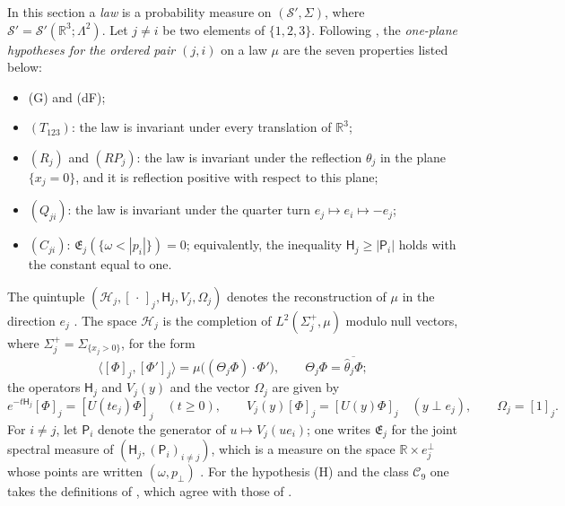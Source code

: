 \documentclass[11pt,letterpaper,reqno]{amsart}
\theoremstyle{definition}
\begin{document}
In this section a \emph{law} is a probability measure on $(\mathcal S',\Sigma)$, where $\mathcal S'=\mathcal S'(\mathbb R^3;\Lambda^2)$.
Let $j\ne i$ be two elements of $\{1,2,3\}$.
Following \cite[Definition~14.2\,(f)]{QEDII}, the \emph{one-plane hypotheses for the ordered pair $(j,i)$} on a law $\mu$ are the seven properties listed below:
\begin{itemize}
\item (G) and (dF);
\item $(T_{123})$: the law is invariant under every translation of $\mathbb R^3$;
\item $(R_j)$ and $(RP_j)$: the law is invariant under the reflection $\theta_j$ in the plane $\{x_j=0\}$, and it is reflection positive with respect to this plane;
\item $(Q_{ji})$: the law is invariant under the quarter turn $e_j\mapsto e_i\mapsto-e_j$;
\item $(C_{ji})$: $\mathfrak E_j(\{\omega<|p_i|\})=0$; equivalently, the inequality $\mathsf H_j\ge|\mathsf P_i|$ holds with the constant equal to one.
\end{itemize}
The quintuple $(\mathcal H_j,[\,\cdot\,]_j,\mathsf H_j,V_j,\Omega_j)$ denotes the reconstruction of $\mu$ in the direction $e_j$ \cite[Definition~2.38]{QEDII}.
The space $\mathcal H_j$ is the completion of $L^2(\Sigma_j^+,\mu)$ modulo null vectors, where $\Sigma_j^+=\Sigma_{\{x_j>0\}}$, for the form
\begin{equation*}
\langle[\Phi]_j,[\Phi']_j\rangle=\mu\big((\Theta_j\Phi)\cdot\Phi'\big),\qquad\Theta_j\Phi=\overline{\hat\theta_j\Phi};
\end{equation*}
the operators $\mathsf H_j$ and $V_j(y)$ and the vector $\Omega_j$ are given by
\begin{equation*}
e^{-t\mathsf H_j}[\Phi]_j=[U(te_j)\Phi]_j\quad(t\ge0),\qquad V_j(y)[\Phi]_j=[U(y)\Phi]_j\quad(y\perp e_j),\qquad\Omega_j=[1]_j.
\end{equation*}
For $i\ne j$, let $\mathsf P_i$ denote the generator of $u\mapsto V_j(ue_i)$; one writes $\mathfrak E_j$ for the joint spectral measure of $(\mathsf H_j,(\mathsf P_i)_{i\ne j})$, which is a measure on the space $\mathbb R\times e_j^\perp$ whose points are written $(\omega,p_\perp)$ \cite[Lemma~12.18\,(b)]{QEDII}.
For the hypothesis (H) and the class $\mathcal C_9$ one takes the definitions of \cite[Definition~2.38]{QEDII}, which agree with those of \cite{QEDIII}.
\end{document}
